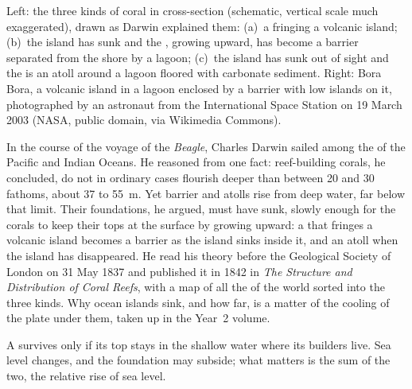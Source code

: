 \begin{omfigure}
{\small Left: the three kinds of coral  in cross-section (schematic,
vertical scale much exaggerated), drawn as Darwin explained them: (a)~a 
fringing a volcanic island; (b)~the island has sunk and the , growing
upward, has become a barrier separated from the shore by a lagoon; (c)~the
island has sunk out of sight and the  is an atoll around a lagoon floored
with carbonate sediment. Right: Bora Bora, a volcanic island in a lagoon
enclosed by a barrier  with low islands on it, photographed by an astronaut
from the International Space Station on 19 March 2003 (NASA, public domain, via
Wikimedia Commons).}
\label{fig:b1:chemical-biogenic-sediments:reefs}
\end{omfigure}

\begin{history}
In the course of the voyage of the \emph{Beagle}, Charles Darwin sailed among
the  of the Pacific and Indian Oceans. He reasoned from one fact: reef-building corals, he concluded, do not in ordinary
cases flourish deeper than between 20 and 30 fathoms, about 37 to \qty{55}{m}.
Yet barrier  and atolls rise from deep water, far below that limit. Their
foundations, he argued, must have sunk, slowly enough for the corals to keep
their tops at the surface by growing upward: a  that fringes a volcanic
island becomes a barrier as the island sinks inside it, and an atoll when the
island has disappeared. He read his theory before the Geological Society of
London on 31 May 1837 and published it in 1842 in \emph{The Structure and
Distribution of Coral Reefs}, with a map of all the  of the world sorted
into the three kinds. Why ocean islands sink, and how far, is a matter of the
cooling of the plate under them, taken up in the Year~2 volume.
\end{history}

A  survives only if its top stays in the shallow water where its builders
live. Sea level changes, and the foundation may subside; what matters is the
sum of the two, the relative rise of sea level.

